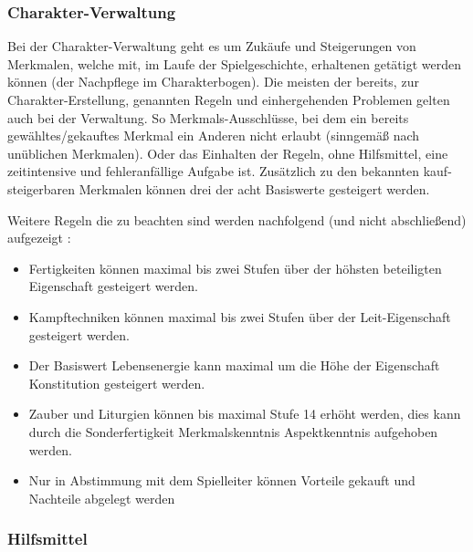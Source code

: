 \subsubsection{Charakter-Verwaltung}
\label{subsubsec:charakter-verwaltung}

Bei der Charakter-Verwaltung geht es um Zukäufe und Steigerungen von Merkmalen, welche mit, im Laufe der Spielgeschichte, erhaltenen  getätigt werden können (\inkl der Nachpflege im Charakterbogen).
Die meisten der bereits, zur Charakter-Erstellung, genannten Regeln und einhergehenden Problemen gelten auch bei der Verwaltung.
So \zB Merkmals-Ausschlüsse, bei dem ein bereits gewähltes/gekauftes Merkmal ein Anderen nicht erlaubt (sinngemäß nach unüblichen Merkmalen).
Oder das Einhalten der Regeln, ohne Hilfsmittel, eine zeitintensive und fehleranfällige Aufgabe ist.
Zusätzlich zu den bekannten kauf- \bzw steigerbaren Merkmalen können drei der acht Basiswerte gesteigert werden.

Weitere Regeln die zu beachten sind werden nachfolgend (und nicht abschließend) aufgezeigt :
\begin{itemize}
    \item Fertigkeiten können maximal bis zwei Stufen über der höhsten beteiligten Eigenschaft gesteigert werden.
    \item Kampftechniken können maximal bis zwei Stufen über der Leit-Eigenschaft gesteigert werden.
    \item Der Basiswert Lebensenergie kann maximal um die Höhe der Eigenschaft Konstitution gesteigert werden.
    \item Zauber und Liturgien können bis maximal Stufe 14 erhöht werden, dies kann durch die Sonderfertigkeit Merkmalskenntnis \bzw Aspektkenntnis aufgehoben werden.
    \item Nur in Abstimmung mit dem Spielleiter können Vorteile gekauft und Nachteile abgelegt werden
\end{itemize}


\subsubsection{Hilfsmittel}
\label{subsubsec:hilftmittel}

